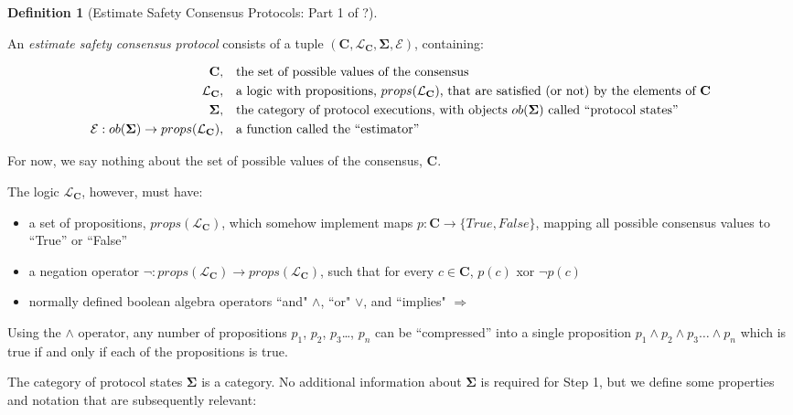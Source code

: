 \documentclass{article}
\theoremstyle{definition}
\newtheorem{defn}{Definition}[section]
\newcommand{\cat}{
	\mathbf
}
\begin{document}
\begin{defn}[Estimate Safety Consensus Protocols: Part 1 of ?]

\begin{description}An \emph{estimate safety consensus protocol} consists of a tuple $(\cat{C}, \mathcal{L}_\cat{C}, \cat{\Sigma}, \mathcal{E})$, containing:

\begin{align*}
\cat{C}, & &&\text{the set of possible values of the consensus}\\
\mathcal{L}_\cat{C}, & &&\text{a logic with propositions, $props(\mathcal{L}_\cat{C})$, that are satisfied (or not) by the elements of $\cat{C}$}\\
\cat{\Sigma}, & &&\text{the category of protocol executions, with objects $ob(\cat{\Sigma})$ called ``protocol states''}\\
\mathcal{E} : ob(\cat{\Sigma}) \to props(\mathcal{L}_\cat{C}), & &&\text{a function called the ``estimator''}
\end{align*}

For now, we say nothing about the set of possible values of the consensus, $\cat{C}$.

The logic $\mathcal{L}_\cat{C}$, however, must have:

   

\begin{itemize}
\item a set of propositions, $props(\mathcal{L}_\cat{C})$, which somehow implement maps $p:\cat{C} \to \{True, False\}$, mapping all possible consensus values to ``True'' or ``False''
\item a negation operator $\neg: props(\mathcal{L}_\cat{C}) \to props(\mathcal{L}_\cat{C})$, such that for every $c \in \cat{C}$, $p(c)$ xor $\neg{p}(c)$
\item normally defined boolean algebra operators ``and" $\land$, ``or" $\lor$, and ``implies" $\Rightarrow$
\end{itemize}

Using the $\land$ operator, any number of propositions $p_1$, $p_2$, $p_3$\ldots, $p_n$ can be ``compressed'' into a single proposition $p_1 \land p_2 \land p_3\ldots \land p_n$ which is true if and only if each of the propositions is true.

The category of protocol states $\cat{\Sigma}$ is a category. No additional information about $\cat{\Sigma}$ is required for Step 1, but we define some properties and notation that are subsequently relevant:


\end{description}
\end{defn}
\end{document}
